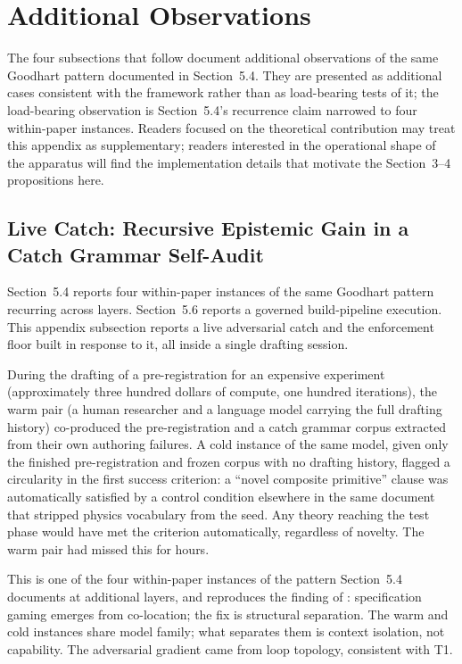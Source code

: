 \documentclass[11pt]{article}
\begin{document}
\appendix
\section{Additional Observations}
\label{app:additional}

The four subsections that follow document additional observations of the same Goodhart pattern documented in Section~5.4. They are presented as additional cases consistent with the framework rather than as load-bearing tests of it; the load-bearing observation is Section~5.4's recurrence claim narrowed to four within-paper instances. Readers focused on the theoretical contribution may treat this appendix as supplementary; readers interested in the operational shape of the apparatus will find the implementation details that motivate the Section~3--4 propositions here.

\subsection{Live Catch: Recursive Epistemic Gain in a Catch Grammar Self-Audit}

Section~5.4 reports four within-paper instances of the same Goodhart pattern recurring across layers. Section~5.6 reports a governed build-pipeline execution. This appendix subsection reports a live adversarial catch and the enforcement floor built in response to it, all inside a single drafting session.

During the drafting of a pre-registration for an expensive experiment (approximately three hundred dollars of compute, one hundred iterations), the warm pair (a human researcher and a language model carrying the full drafting history) co-produced the pre-registration and a catch grammar corpus extracted from their own authoring failures. A cold instance of the same model, given only the finished pre-registration and frozen corpus with no drafting history, flagged a circularity in the first success criterion: a ``novel composite primitive'' clause was automatically satisfied by a control condition elsewhere in the same document that stripped physics vocabulary from the seed. Any theory reaching the test phase would have met the criterion automatically, regardless of novelty. The warm pair had missed this for hours.

This is one of the four within-paper instances of the pattern Section~5.4 documents at additional layers, and reproduces the finding of \citet{alami2025a, alami2025b, alami2025c}: specification gaming emerges from co-location; the fix is structural separation. The warm and cold instances share model family; what separates them is context isolation, not capability. The adversarial gradient came from loop topology, consistent with T1.
\end{document}

